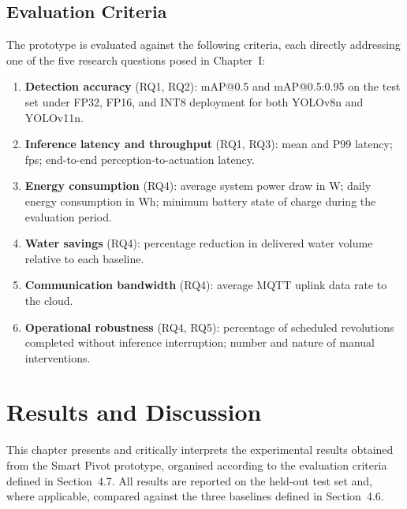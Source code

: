 \documentclass[12pt,a4paper]{report}
\begin{document}
\section{Evaluation Criteria}

The prototype is evaluated against the following criteria, each directly addressing one of the five research questions posed in Chapter~I:

\begin{enumerate}
    \item \textbf{Detection accuracy} (RQ1, RQ2): mAP@0.5 and mAP@0.5:0.95 on the test set under FP32, FP16, and INT8 deployment for both YOLOv8n and YOLOv11n.
    \item \textbf{Inference latency and throughput} (RQ1, RQ3): mean and P99 latency; fps; end-to-end perception-to-actuation latency.
    \item \textbf{Energy consumption} (RQ4): average system power draw in W; daily energy consumption in Wh; minimum battery state of charge during the evaluation period.
    \item \textbf{Water savings} (RQ4): percentage reduction in delivered water volume relative to each baseline.
    \item \textbf{Communication bandwidth} (RQ4): average MQTT uplink data rate to the cloud.
    \item \textbf{Operational robustness} (RQ4, RQ5): percentage of scheduled revolutions completed without inference interruption; number and nature of manual interventions.
\end{enumerate}

\chapter{Results and Discussion}
\label{ch:results}
\pagestyle{fancy}
\thispagestyle{empty}

This chapter presents and critically interprets the experimental results obtained from the Smart Pivot prototype, organised according to the evaluation criteria defined in Section~4.7. All results are reported on the held-out test set and, where applicable, compared against the three baselines defined in Section~4.6.
\end{document}
